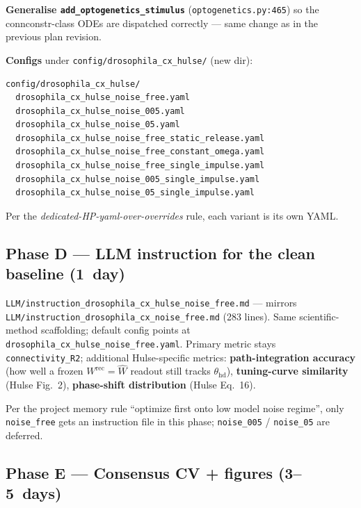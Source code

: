 \documentclass[11pt]{article}
\begin{document}
\textbf{Generalise \texttt{add\_optogenetics\_stimulus}}
(\texttt{optogenetics.py:465}) so the connconstr-class ODEs are
dispatched correctly --- same change as in the previous plan revision.

\textbf{Configs} under \texttt{config/drosophila\_cx\_hulse/} (new dir):

\begin{lstlisting}
config/drosophila_cx_hulse/
  drosophila_cx_hulse_noise_free.yaml
  drosophila_cx_hulse_noise_005.yaml
  drosophila_cx_hulse_noise_05.yaml
  drosophila_cx_hulse_noise_free_static_release.yaml
  drosophila_cx_hulse_noise_free_constant_omega.yaml
  drosophila_cx_hulse_noise_free_single_impulse.yaml
  drosophila_cx_hulse_noise_005_single_impulse.yaml
  drosophila_cx_hulse_noise_05_single_impulse.yaml
\end{lstlisting}

Per the \textit{dedicated-HP-yaml-over-overrides} rule, each variant is
its own YAML.

\subsection*{Phase D --- LLM instruction for the clean baseline (1~day)}

\texttt{LLM/instruction\_drosophila\_cx\_hulse\_noise\_free.md} ---
mirrors \texttt{LLM/instruction\_drosophila\_cx\_noise\_free.md}
(283 lines). Same scientific-method scaffolding; default config points at
\texttt{drosophila\_cx\_hulse\_noise\_free.yaml}. Primary metric stays
\texttt{connectivity\_R2}; additional Hulse-specific metrics:
\textbf{path-integration accuracy} (how well a frozen
$W^{\text{rec}}=\hat{W}$ readout still tracks $\theta_{\text{hd}}$),
\textbf{tuning-curve similarity} (Hulse Fig.~2), \textbf{phase-shift
distribution} (Hulse Eq.~16).

Per the project memory rule ``optimize first onto low model noise
regime'', only \texttt{noise\_free} gets an instruction file in this
phase; \texttt{noise\_005} / \texttt{noise\_05} are deferred.

\subsection*{Phase E --- Consensus CV + figures (3--5~days)}
\end{document}
